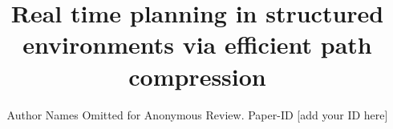 \documentclass[conference]{IEEEtran}
\begin{document}
\title{Real time planning in structured environments via efficient path compression}

\author{Author Names Omitted for Anonymous Review. Paper-ID [add your ID here]}





% 


\maketitle
\end{document}
